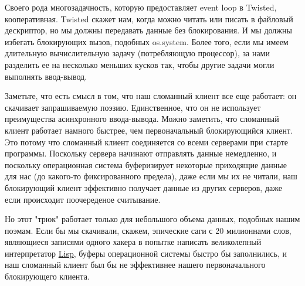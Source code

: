 Своего рода многозадачность, которую предоставляет 
event loop в Twisted, кооперативная. Twisted 
скажет нам, когда можно читать или писать в файловый 
дескриптор, но мы должны передавать данные без блокирования. 
И мы должны избегать блокирующих вызов, подобных os.system. 
Более того, если мы имеем длительную вычислительную 
задачу (потребляющую процессор), за нами разделить 
ее на несколько меньших кусков так, чтобы другие задачи  
могли выполнять ввод-вывод.



Заметьте, что есть смысл в том, что наш сломанный клиент 
все еще работает: он скачивает запрашиваемую поэзию. 
Единственное, что он не использует преимущества асинхронного 
ввода-вывода. Можно заметить, что сломанный клиент работает 
намного быстрее, чем первоначальный блокирующийся клиент. 
Это потому что сломанный клиент соединяется со всеми 
серверами при старте программы. Поскольку сервера начинают отправлять 
данные немедленно, и поскольку операционная система буферизирует 
некоторые приходящие данные для нас (до какого-то фиксированного предела), 
даже если мы их не читали, наш блокирующий клиент 
эффективно получает данные из других серверов, даже если 
происходит поочереденое считывание.




Но этот "трюк" работает только для небольшого объема данных, 
подобных нашим поэмам. Если бы мы скачивали, скажем, эпические 
саги с 20 милионнами слов, являющиеся записями одного 
хакера в попытке написать великолепный интерпретатор
\href{http://en.wikipedia.org/wiki/Lisp\_(programming\_language)}{Lisp}, 
буферы операционной системы быстро бы заполнились, и наш 
сломанный клиент был бы не эффективнее нашего первоначального 
блокирующего клиента.

